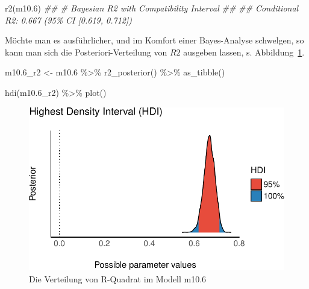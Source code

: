 \documentclass[
  a4paper,
  DIV=11]{scrreprt}
\newenvironment{Shaded}{\begin{snugshade}}{\end{snugshade}}
\newcommand{\DocumentationTok}[1]{\textcolor[rgb]{0.37,0.37,0.37}{\textit{#1}}}
\newcommand{\FloatTok}[1]{\textcolor[rgb]{0.68,0.00,0.00}{#1}}
\newcommand{\FunctionTok}[1]{\textcolor[rgb]{0.28,0.35,0.67}{#1}}
\newcommand{\NormalTok}[1]{\textcolor[rgb]{0.00,0.23,0.31}{#1}}
\newcommand{\OtherTok}[1]{\textcolor[rgb]{0.00,0.23,0.31}{#1}}
\newcommand{\SpecialCharTok}[1]{\textcolor[rgb]{0.37,0.37,0.37}{#1}}
\theoremstyle{definition}
\theoremstyle{remark}
\begin{document}
\begin{Shaded}
\begin{Highlighting}[]
\FunctionTok{r2}\NormalTok{(m10}\FloatTok{.6}\NormalTok{)}
\DocumentationTok{\#\# \# Bayesian R2 with Compatibility Interval}
\DocumentationTok{\#\# }
\DocumentationTok{\#\#   Conditional R2: 0.667 (95\% CI [0.619, 0.712])}
\end{Highlighting}
\end{Shaded}

Möchte man es ausführlicher, und im Komfort einer Bayes-Analyse
schwelgen, so kann man sich die Posteriori-Verteilung von \(R2\)
ausgeben lassen, s. Abbildung~\ref{fig-m106-r2}.

\begin{Shaded}
\begin{Highlighting}[]
\NormalTok{m10}\FloatTok{.6}\NormalTok{\_r2 }\OtherTok{\textless{}{-}}
\NormalTok{m10}\FloatTok{.6} \SpecialCharTok{\%\textgreater{}\%} 
  \FunctionTok{r2\_posterior}\NormalTok{() }\SpecialCharTok{\%\textgreater{}\%} 
  \FunctionTok{as\_tibble}\NormalTok{()}

\FunctionTok{hdi}\NormalTok{(m10}\FloatTok{.6}\NormalTok{\_r2) }\SpecialCharTok{\%\textgreater{}\%} 
  \FunctionTok{plot}\NormalTok{()}
\end{Highlighting}
\end{Shaded}

\begin{figure}[H]

{\centering \includegraphics{./metrische-AV_files/figure-pdf/fig-m106-r2-1.pdf}

}

\caption{\label{fig-m106-r2}Die Verteilung von R-Quadrat im Modell
m10.6}

\end{figure}
\end{document}
